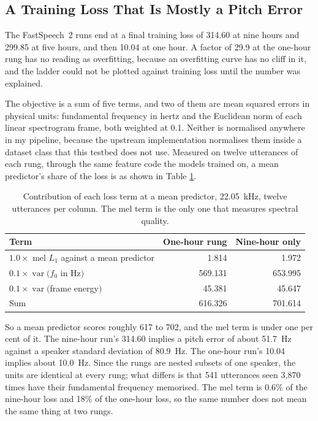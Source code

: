 \documentclass[runningheads]{llncs}
\begin{document}
\subsection{A Training Loss That Is Mostly a Pitch Error}
\label{sec:loss}

The FastSpeech~2 runs end at a final training loss of 314.60 at nine hours and
299.85 at five hours, and then 10.04 at one hour. A factor of 29.9 at the
one-hour rung has no reading as overfitting, because an overfitting curve has
no cliff in it, and the ladder could not be plotted against training loss
until the number was explained.

The objective is a sum of five terms, and two of them are mean squared errors
in physical units: fundamental frequency in hertz and the Euclidean norm of
each linear spectrogram frame, both weighted at 0.1. Neither is normalised
anywhere in my pipeline, because the upstream implementation normalises them
inside a dataset class that this testbed does not use. Measured on twelve
utterances of each rung, through the same feature code the models trained on,
a mean predictor's share of the loss is as shown in Table \ref{tab:loss}.

\begin{table}[t]
\centering
\caption{Contribution of each loss term at a mean predictor, 22.05~kHz, twelve
utterances per column. The mel term is the only one that measures spectral
quality.}
\label{tab:loss}
\begin{tabular}{lrr}
\toprule
Term & One-hour rung & Nine-hour only \\
\midrule
$1.0 \times$ mel $L_1$ against a mean predictor & 1.814 & 1.972 \\
$0.1 \times \operatorname{var}(f_0$ in Hz$)$ & 569.131 & 653.995 \\
$0.1 \times \operatorname{var}($frame energy$)$ & 45.381 & 45.647 \\
\midrule
Sum & 616.326 & 701.614 \\
\bottomrule
\end{tabular}
\end{table}

So a mean predictor scores roughly 617 to 702, and the mel term is under one
per cent of it. The nine-hour run's 314.60 implies a pitch error of about
51.7~Hz against a speaker standard deviation of 80.9~Hz. The one-hour run's
10.04 implies about 10.0~Hz. Since the rungs are nested subsets of one
speaker, the units are identical at every rung; what differs is that 541
utterances seen 3{,}870 times have their fundamental frequency memorised. The
mel term is 0.6\% of the nine-hour loss and 18\% of the one-hour loss, so the
same number does not mean the same thing at two rungs.
\end{document}
